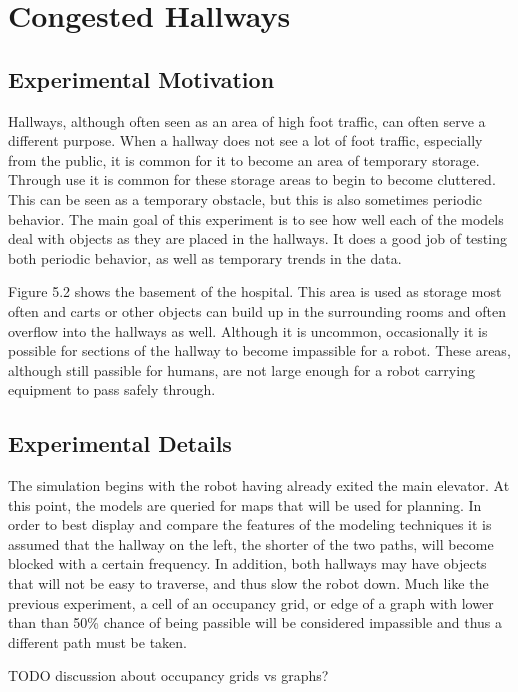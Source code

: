 \section{ Congested Hallways }

\subsection{ Experimental Motivation }

Hallways, although often seen as an area of high foot traffic, can often serve
a different purpose. When a hallway does not see a lot of foot traffic,
especially from the public, it is common for it to become an area of temporary
storage.  Through use it is common for these storage areas to begin to become
cluttered. This can be seen as a temporary obstacle, but this is also
sometimes periodic behavior. The main goal of this  experiment is to see how
well each of the models deal with objects as they are placed in the hallways.
It does a good job of testing both periodic behavior, as well as temporary
trends in the data.

Figure 5.2 shows the basement of the hospital. This area is used as storage
most often and carts or other objects can build up in the surrounding rooms and
often overflow into the hallways as well. Although it is uncommon, occasionally
it is possible for sections of the hallway to become impassible for a robot.
These areas, although still passible for humans, are not large enough for a
robot carrying equipment to pass safely through.


\subsection{ Experimental Details }

The simulation begins with the robot having already exited the main elevator.
At this point, the models are queried for maps that will be used for planning.
In order to best display and compare the features of the modeling techniques
it is assumed that the hallway on the left, the shorter of the two paths, will
become blocked with a certain frequency. In addition, both hallways may have
objects that will not be easy to traverse, and thus slow the robot down. Much
like the previous experiment, a cell of an occupancy grid, or edge of a graph
with lower than than 50\% chance of being passible will be considered
impassible and thus a different path must be taken.

TODO discussion about occupancy grids vs graphs?



